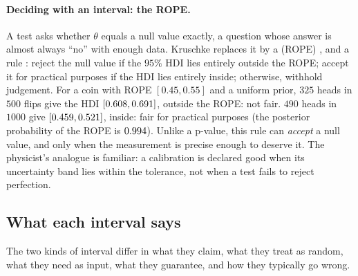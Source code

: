 \paragraph{Deciding with an interval: the ROPE.}
A test asks whether $\theta$ equals a null value exactly, a question whose
answer is almost always ``no'' with enough data. Kruschke replaces it by a
 (ROPE) , and a rule
: reject the null value if the $95\%$ HDI lies entirely
outside the ROPE; accept it for practical purposes if the HDI lies entirely inside;
otherwise, withhold judgement. For a coin with ROPE $[0.45,0.55]$ and a uniform
prior, $325$ heads in $500$ flips give the HDI $[0.608,0.691]$,
outside the ROPE: not fair. $490$ heads in $1000$ give
$[0.459,0.521]$, inside: fair for practical purposes (the
posterior probability of the ROPE is $0.994$). Unlike a p-value, this rule
can \emph{accept} a null value, and only when the measurement is precise enough to
deserve it. The physicist's analogue is familiar: a calibration is declared good
when its uncertainty band lies within the tolerance, not when a test fails to
reject perfection.

\subsection{What each interval says}
\label{4b:sec:words}

The two kinds of interval differ in what they claim, what they treat as random,
what they need as input, what they guarantee, and how they typically go wrong.

